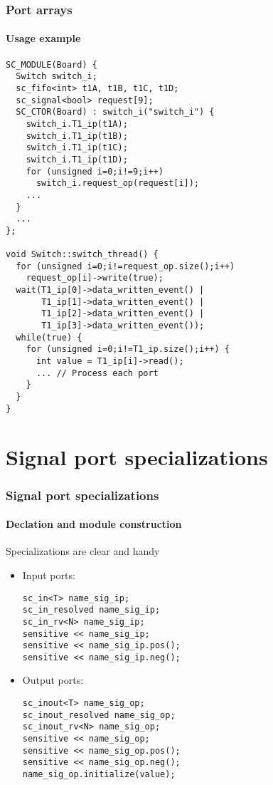 \begin{frame}[fragile]
\frametitle{Port arrays}
\framesubtitle{Usage example}

{\tiny 
\begin{verbatim}
SC_MODULE(Board) {
  Switch switch_i;
  sc_fifo<int> t1A, t1B, t1C, t1D;
  sc_signal<bool> request[9];
  SC_CTOR(Board) : switch_i("switch_i") {
    switch_i.T1_ip(t1A);
    switch_i.T1_ip(t1B);
    switch_i.T1_ip(t1C);
    switch_i.T1_ip(t1D);
    for (unsigned i=0;i!=9;i++)
      switch_i.request_op(request[i]);
    ...
  }
  ...
};

void Switch::switch_thread() {
  for (unsigned i=0;i!=request_op.size();i++) 
    request_op[i]->write(true);
  wait(T1_ip[0]->data_written_event() | 
       T1_ip[1]->data_written_event() |
       T1_ip[2]->data_written_event() | 
       T1_ip[3]->data_written_event());
  while(true) {
    for (unsigned i=0;i!=T1_ip.size();i++) {
      int value = T1_ip[i]->read();
      ... // Process each port 
    }
  }
}
\end{verbatim}
}
\end{frame}

\section{Signal port specializations}

\begin{frame}[fragile]
\frametitle{Signal port specializations}
\framesubtitle{Declation and module construction}
\begin{block}{Specializations are clear and handy}
\vspace{0.5em}
\begin{itemize}
\item Input ports:
{\scriptsize 
\begin{verbatim}
sc_in<T> name_sig_ip;
sc_in_resolved name_sig_ip;
sc_in_rv<N> name_sig_ip;
sensitive << name_sig_ip;
sensitive << name_sig_ip.pos();
sensitive << name_sig_ip.neg();
\end{verbatim}
}
\vspace{0.5em}
\pause
\item Output ports:
{\scriptsize 
\begin{verbatim}
sc_inout<T> name_sig_op;
sc_inout_resolved name_sig_op;
sc_inout_rv<N> name_sig_op;
sensitive << name_sig_op;
sensitive << name_sig_op.pos();
sensitive << name_sig_op.neg();
name_sig_op.initialize(value);
\end{verbatim}
}
\end{itemize}

\end{block}

\end{frame}

